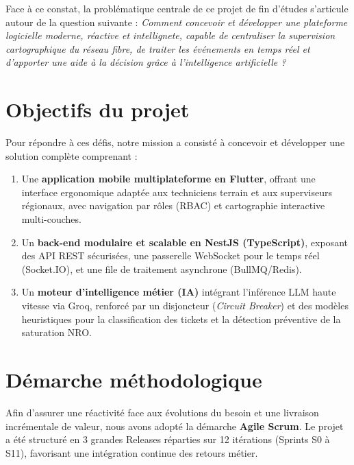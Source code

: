 Face \`a ce constat, la probl\'ematique centrale de ce projet de fin d'\'etudes s'articule autour de la question suivante : \textit{Comment concevoir et d\'evelopper une plateforme logicielle moderne, r\'eactive et intellignete, capable de centraliser la supervision cartographique du r\'eseau fibre, de traiter les \'ev\'enements en temps r\'eel et d'apporter une aide \`a la d\'ecision gr\^ace \`a l'intelligence artificielle ?}

\section*{Objectifs du projet}
Pour r\'epondre \`a ces d\'efis, notre mission a consist\'e \`a concevoir et d\'evelopper une solution compl\`ete comprenant :
\begin{enumerate}
    \item Une \textbf{application mobile multiplateforme en Flutter}, offrant une interface ergonomique adapt\'ee aux techniciens terrain et aux superviseurs r\'egionaux, avec navigation par r\^oles (RBAC) et cartographie interactive multi-couches.
    \item Un \textbf{back-end modulaire et scalable en NestJS (TypeScript)}, exposant des API REST s\'ecuris\'ees, une passerelle WebSocket pour le temps r\'eel (Socket.IO), et une file de traitement asynchrone (BullMQ/Redis).
    \item Un \textbf{moteur d'intelligence m\'etier (IA)} int\'egrant l'inf\'erence LLM haute vitesse via Groq, renforc\'e par un disjoncteur (\textit{Circuit Breaker}) et des mod\`eles heuristiques pour la classification des tickets et la d\'etection pr\'eventive de la saturation NRO.
\end{enumerate}

\section*{D\'emarche m\'ethodologique}
Afin d'assurer une r\'eactivit\'e face aux \'evolutions du besoin et une livraison incr\'ementale de valeur, nous avons adopt\'e la d\'emarche \textbf{Agile Scrum}. Le projet a \'et\'e structur\'e en 3 grandes Releases r\'eparties sur 12 it\'erations (Sprints S0 \`a S11), favorisant une int\'egration continue des retours m\'etier.

